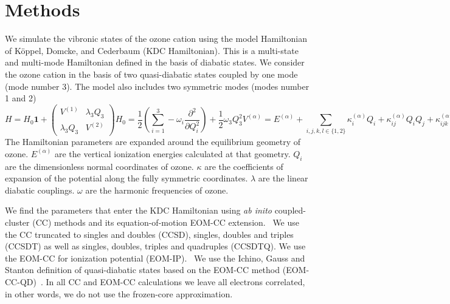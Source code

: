 \documentclass[12pt,prb,aps]{revtex4-2}
\begin{document}
\section{Methods}

We simulate the vibronic states of the ozone cation using the model
Hamiltonian of K{\"o}ppel, Domcke, and Cederbaum (KDC
Hamiltonian).\cite{Cederbaum:LVC:84,KDC:81,Koppel:CIbookCh7:04} This is a
multi-state and multi-mode Hamiltonian defined in the basis of diabatic
states.  We consider the ozone cation in the basis of two quasi-diabatic
states coupled by one mode (mode number 3). The model also includes two
symmetric modes (modes number 1 and 2)
\begin{subequations}
    \begin{equation}
        H = H _0 \mathbf{1}
        +
        \begin{pmatrix}
            V ^{(1)}  & \lambda _3 Q _3\\
            \lambda _3 Q _3 & V ^{(2)}
        \end{pmatrix}
    \end{equation}
    \begin{equation}
        H _0 = 
        \frac{1}{2} \left(\sum _{i = 1}^3 
        - \omega _i \frac{\partial ^2}{\partial Q _i ^2 }\right)
        + \frac{1}{2}\omega _3 Q _3 ^2
    \end{equation}
    \begin{equation}
        V ^{(\alpha)} = 
        E ^{(\alpha)} 
        + \sum _{i,j,k,l \in \{1,2\}} 
            \kappa ^{(\alpha)} _i Q _i 
            + \kappa ^{(\alpha)} _{ij} Q _i Q _j 
            + \kappa ^{(\alpha)} _{ijk} Q _i Q _j Q _k 
            + \kappa ^{(\alpha)} _{ijkl} Q_i Q _j Q _k Q _l.
    \end{equation}
    \label{eq:KDC}
\end{subequations}
The Hamiltonian parameters are expanded around the equilibrium geometry of
ozone. $E ^{(\alpha)}$ are the vertical ionization energies calculated at that
geometry. $Q_i$ are the dimensionless normal coordinates of ozone. $\kappa$ are
the coefficients of expansion of the potential along the fully symmetric
coordinates. $\lambda$ are the linear diabatic couplings.  $\omega$ are the
harmonic frequencies of ozone.

We find the parameters that enter the KDC Hamiltonian using \emph{ab inito}
coupled-cluster (CC) methods and its equation-of-motion EOM-CC
extension.~\cite{Bartlett:CC_review:07, Krylov:EOMRev:07, Bartlett:Book:09,
Christiansen:EOMRev:11, Bartlet:EOMRev:12, Krylov:OSRev} We use the CC
truncated to singles and doubles (CCSD), singles, doubles and triples (CCSDT)
as well as singles, doubles, triples and quadruples
(CCSDTQ).\cite{Matthews:ncc:2015}  We use the EOM-CC for ionization potential
(EOM-IP).~\cite{StantonGauss:EOMIP:99} We use the Ichino, Gauss and Stanton
definition of quasi-diabatic states based on the EOM-CC method
(EOM-CC-QD)~\cite{Stanton:EOMIPdeg:09}. In all CC and EOM-CC calculations we
leave all electrons correlated, in other words, we do not use the
frozen-core approximation.
\end{document}
